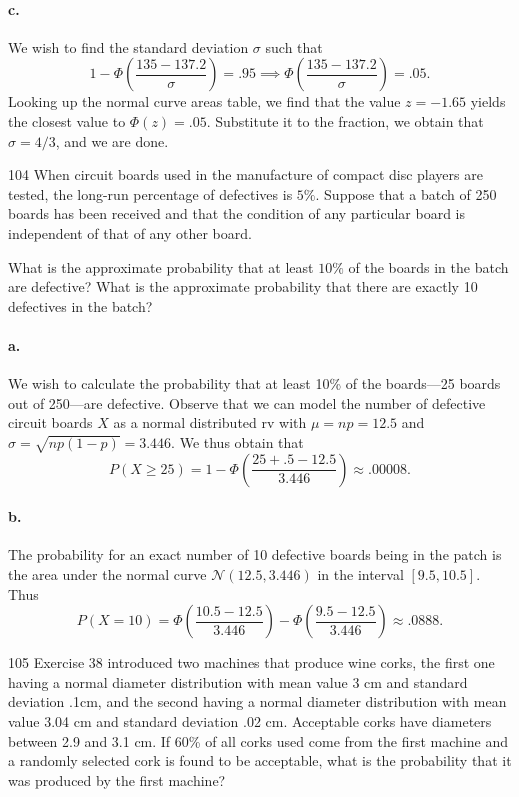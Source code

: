 \documentclass{exam}
\newcommand{\paren}[1]{\left(#1\right)}
\begin{document}
\paragraph{c.} We wish to find the standard deviation $\sigma$ such that \[
	1 - \Phi\paren{\frac{135 - 137.2}{\sigma}} = .95 \implies \Phi\paren{\frac{135 - 137.2}{\sigma}} = .05.
\]
Looking up the normal curve areas table, we find that the value $z = -1.65$ yields the closest value to $\Phi(z) = .05$. Substitute it to the fraction, we obtain that $\sigma = 4/3$, and we are done.

\begin{problem}{104}
	When circuit boards used in the manufacture of compact disc players are tested, the long-run percentage of defectives is $5\%$. Suppose that a batch of 250 boards has been received and that the condition of any particular board is independent of that of any other board.
	\begin{tasks}[label=\textbf{\alph*.}]
		\task What is the approximate probability that at least $10\%$ of the boards in the batch are defective?
		\task What is the approximate probability that there are exactly 10 defectives in the batch?
	\end{tasks}
\end{problem}

\paragraph{a.} We wish to calculate the probability that at least 10\% of the boards---25 boards out of 250---are defective. Observe that we can model the number of defective circuit boards $X$ as a normal distributed rv with $\mu = np = 12.5$ and $\sigma = \sqrt{np(1 - p)} = 3.446$. We thus obtain that
\[
	P(X \ge 25) = 1 - \Phi\paren{\frac{25 + .5 - 12.5}{3.446}} \approx .00008.
\]

\paragraph{b.} The probability for an exact number of 10 defective boards being in the patch is the area under the normal curve $\mathcal N(12.5, 3.446)$ in the interval $[9.5, 10.5]$. Thus
\[
	P(X = 10) = \Phi\paren{\frac{10.5 - 12.5}{3.446}} - \Phi\paren{\frac{9.5 - 12.5}{3.446}} \approx .0888.
\]

\begin{problem}{105}
	Exercise 38 introduced two machines that produce wine corks, the first one having a normal diameter distribution with mean value 3 cm and standard deviation .1cm, and the second having a normal diameter distribution with mean value 3.04 cm and standard deviation .02 cm. Acceptable corks have diameters between 2.9 and 3.1 cm. If 60\% of all corks used come from the first machine and a randomly selected cork is found to be acceptable, what is the probability that it was produced by the first machine?
\end{problem}
\end{document}
